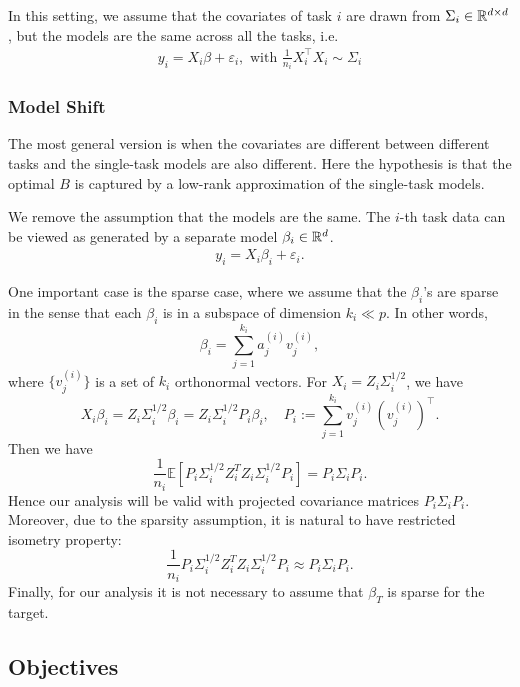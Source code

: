 In this setting, we assume that the covariates of task $i$ are drawn from $\Sigma_i \in \mathbb{R}^{d \times d}$, but the models are the same across all the tasks, i.e.
\begin{align}
	y_i = X_i \beta + \varepsilon_i, \mbox{ with } \frac 1 {n_i} X_i^{\top}X_i \sim \Sigma_i
\end{align}



\subsubsection{Model Shift}

The most general version is when the covariates are different between different tasks and the single-task models are also different.
Here the hypothesis is that the optimal $B$ is captured by a low-rank approximation of the single-task models.


We remove the assumption that the models are the same.
The $i$-th task data can be viewed as generated by a separate model $\beta_i\in\mathbb{R}^d$.
\begin{align}
	y_i = X_i \beta_i + \varepsilon_i.
\end{align}

One important case is the sparse case, where we assume that the $\beta_i$'s are sparse in the sense 
that each $\beta_i$ is in a subspace of dimension $k_i\ll p$. In other words,
$$\beta_i = \sum_{j=1}^{k_i} a^{(i)}_j v^{(i)}_j,$$
where $\{v^{(i)}_j\}$ is a set of $k_i$ orthonormal vectors. For $X_i= Z_i \Sigma_i^{1/2}$, we have 
$$ X_i \beta_i = Z_i \Sigma_i^{1/2}\beta_i=  Z_i \Sigma_i^{1/2}P_i\beta_i,\quad P_i:= \sum_{j=1}^{k_i}v_j^{(i)}(v_j^{(i)})^\top.$$
Then we have 
$$\frac{1}{n_i}\mathbb E\left[P_i \Sigma_i^{1/2} Z_i^T Z_i \Sigma_i^{1/2}P_i\right]=P_i \Sigma_i P_i.$$
Hence our analysis will be valid with projected covariance matrices $P_i \Sigma_i P_i$. Moreover, due to the sparsity assumption, it is natural to have restricted isometry property: 
$$\frac{1}{n_i} P_i \Sigma_i^{1/2} Z_i^T Z_i \Sigma_i^{1/2}P_i \approx P_i \Sigma_i P_i.$$
Finally, for our analysis it is not necessary to assume that $\beta_T$ is sparse for the target. 

\subsection{Objectives}

